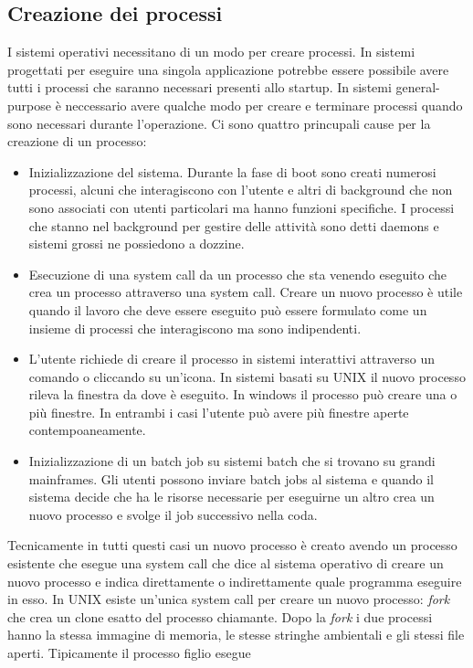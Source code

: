 \subsection{Creazione dei processi}
I sistemi operativi necessitano di un modo per creare processi. In sistemi progettati per eseguire una singola applicazione potrebbe essere possibile avere tutti i processi che saranno
necessari presenti allo startup. In sistemi general-purpose \`e neccessario avere qualche modo per creare e terminare processi quando sono necessari durante l'operazione. Ci sono
quattro princupali cause per la creazione di un processo:
\begin{itemize}
	\item Inizializzazione del sistema. Durante la fase di boot sono creati numerosi processi, alcuni che interagiscono con l'utente e altri di background che non sono associati con
	      utenti particolari ma hanno funzioni specifiche. I processi che stanno nel background per gestire delle attivit\`a sono detti daemons e sistemi grossi ne possiedono a
	      dozzine.
	\item Esecuzione di una system call da un processo che sta venendo eseguito che crea un processo attraverso una system call. Creare un nuovo processo \`e utile quando il lavoro
	      che deve essere eseguito pu\`o essere formulato come un insieme di processi che interagiscono ma sono indipendenti.
	\item L'utente richiede di creare il processo in sistemi interattivi attraverso un comando o cliccando su un'icona. In sistemi basati su UNIX il nuovo processo rileva la finestra
	      da dove \`e eseguito. In windows il processo pu\`o creare una o pi\`u finestre. In entrambi i casi l'utente pu\`o avere pi\`u finestre aperte contempoaneamente.
	\item Inizializzazione di un batch job su sistemi batch che si trovano su grandi mainframes. Gli utenti possono inviare batch jobs al sistema e quando il sistema decide che ha
	      le risorse necessarie per eseguirne un altro crea un nuovo processo e svolge il job successivo nella coda.
\end{itemize}
Tecnicamente in tutti questi casi un nuovo processo \`e creato avendo un processo esistente che esegue una system call che dice al sistema operativo di creare un nuovo processo e indica
direttamente o indirettamente quale programma eseguire in esso. In UNIX esiste un'unica system call per creare un nuovo processo: \emph{fork} che crea un clone esatto del processo
chiamante. Dopo la \emph{fork} i due processi hanno la stessa immagine di memoria, le stesse stringhe ambientali e gli stessi file aperti. Tipicamente il processo figlio esegue

